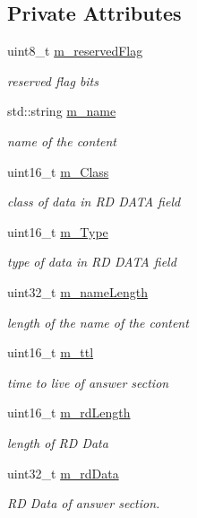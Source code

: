 \subsection*{Private Attributes}
\begin{DoxyCompactItemize}
\item 
uint8\-\_\-t \hyperlink{classns3_1_1DnsPlusAnswerSection_ab7c55e4309c4e3ea9d2f6cee4f51a5a9}{m\-\_\-reserved\-Flag}
\begin{DoxyCompactList}\small\item\em reserved flag bits \end{DoxyCompactList}\item 
std\-::string \hyperlink{classns3_1_1DnsPlusAnswerSection_a4e6ba01e32ecd32c175a814f60ddd315}{m\-\_\-name}
\begin{DoxyCompactList}\small\item\em name of the content \end{DoxyCompactList}\item 
uint16\-\_\-t \hyperlink{classns3_1_1DnsPlusAnswerSection_a9ea44f6d896057b365c56b947cd051b4}{m\-\_\-\-Class}
\begin{DoxyCompactList}\small\item\em class of data in R\-D D\-A\-T\-A field \end{DoxyCompactList}\item 
uint16\-\_\-t \hyperlink{classns3_1_1DnsPlusAnswerSection_aa1a416336d5681c959c988c299a6cddf}{m\-\_\-\-Type}
\begin{DoxyCompactList}\small\item\em type of data in R\-D D\-A\-T\-A field \end{DoxyCompactList}\item 
uint32\-\_\-t \hyperlink{classns3_1_1DnsPlusAnswerSection_ac7759da5ffc094ed4d0e60d7095ed1d2}{m\-\_\-name\-Length}
\begin{DoxyCompactList}\small\item\em length of the name of the content \end{DoxyCompactList}\item 
uint16\-\_\-t \hyperlink{classns3_1_1DnsPlusAnswerSection_a2b8a98168673224b6575ab009e883d2f}{m\-\_\-ttl}
\begin{DoxyCompactList}\small\item\em time to live of answer section \end{DoxyCompactList}\item 
uint16\-\_\-t \hyperlink{classns3_1_1DnsPlusAnswerSection_a87bd32bf4be3b0d809014553260f5abb}{m\-\_\-rd\-Length}
\begin{DoxyCompactList}\small\item\em length of R\-D Data \end{DoxyCompactList}\item 
uint32\-\_\-t \hyperlink{classns3_1_1DnsPlusAnswerSection_ab02f72df4dd55bc16b58c4915e7bc0ce}{m\-\_\-rd\-Data}
\begin{DoxyCompactList}\small\item\em R\-D Data of answer section. \end{DoxyCompactList}\end{DoxyCompactItemize}


